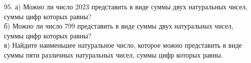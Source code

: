 95. а) Можно ли число 2023 представить в виде суммы двух натуральных чисел, суммы цифр которых равны?\\
б) Можно ли число 799 представить в виде суммы двух натуральных чисел, суммы цифр которых равны?\\
в) Найдите наименьшее натуральное число, которое можно представить в виде суммы пяти различных натуральных чисел, суммы цифр которых равны.\\
